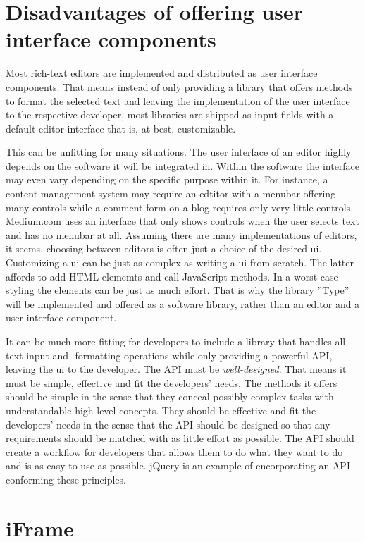 \section{Disadvantages of offering user interface components}

Most rich-text editors are implemented and distributed as user interface components. That means instead of only providing a library that offers methods to format the selected text and leaving the implementation of the user interface to the respective developer, most libraries are shipped as input fields with a default editor interface that is, at best, customizable.

This can be unfitting for many situations. The user interface of an editor highly depends on the software it will be integrated in. Within the software the interface may even vary depending on the specific purpose within it. For instance, a content management system may require an edtitor with a menubar offering many controls while a comment form on a blog requires only very little controls. Medium.com uses an interface that only shows controls when the user selects text and has no menubar at all. Assuming there are many implementations of editors, it seems, choosing between editors is often just a choice of the desired ui. Customizing a ui can be just as complex as writing a ui from scratch. The latter affords to add HTML elememts and call JavaScript methods. In a worst case styling the elements can be just as much effort. That is why the library ''Type'' will be implemented and offered as a software library, rather than an editor and a user interface component.

It can be much more fitting for developers to include a library that handles all text-input and -formatting operations while only providing a powerful API, leaving the ui to the developer. The API must be \textit{well-designed}. That means it must be simple, effective and fit the developers' needs. The methods it offers should be simple in the sense that they conceal possibly complex tasks with understandable high-level concepts. They should be effective and fit the developers' needs in the sense that the API should be designed so that any requirements should be matched with as little effort as possible. The API should create a workflow for developers that allows them to do what they want to do and is as easy to use as possible. jQuery is an example of encorporating an API conforming these principles.

\section{iFrame}

